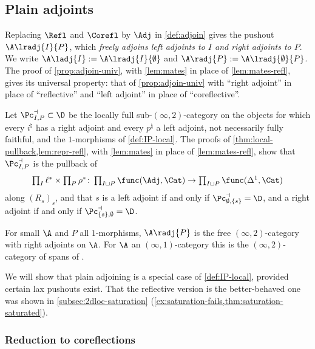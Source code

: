 \subsection{Plain adjoints}
\label{subsec:2dloc-plain}

Replacing $\Refl$ and $\Corefl$ by $\Adj$ in \cref{def:adjoin} gives the pushout $\A\lradj{I}{P}$, which \emph{freely adjoins left adjoints to $I$ and right adjoints to $P$}. We write $\A\ladj{I} := \A\lradj{I}{\emptyset}$ and $\A\radj{P} := \A\lradj{\emptyset}{P}$.
The proof of \cref{prop:adjoin-univ}, with \cref{lem:mates} in place of \cref{lem:mates-refl}, gives its universal property: that of \cref{prop:adjoin-univ} with ``right adjoint'' in place of ``reflective'' and ``left adjoint'' in place of ``coreflective''.

Let $\Pc^{\dashv}_{I,P} \subset \D$ be the locally full sub-$(\infty,2)$-category on the objects for which every $i^{\natural}$ has a right adjoint and every $p^{\natural}$ a left adjoint, not necessarily fully faithful, and the $1$-morphisms of \cref{def:IP-local}.
The proofs of \cref{thm:local-pullback,lem:repr-refl}, with \cref{lem:mates} in place of \cref{lem:mates-refl}, show that $\Pc^{\dashv}_{I,P}$ is the pullback of
\[
\textstyle\prod_{I}\ell^{*} \times \prod_{P}\rho^{*}\colon \prod_{I \sqcup P}\func(\Adj,\Cat) \to \prod_{I \sqcup P}\func(\Delta^{1},\Cat)
\]
along $(R_{s})_{s}$, and that $s$ is a left adjoint if and only if $\Pc^{\dashv}_{\emptyset,\{s\}} = \D$, and a right adjoint if and only if $\Pc^{\dashv}_{\{s\},\emptyset} = \D$.

\begin{exmp}
\label{ex:plain-spans}
For small $\A$ and $P$ all $1$-morphisms, $\A\radj{P}$ is the free $(\infty,2)$-category with right adjoints on $\A$. For $\A$ an $(\infty,1)$-category this is the $(\infty,2)$-category of spans of \cite{haugseng2018iteratedspans,cnossenlenzlinskens2025universal}.
\end{exmp}

We will show that plain adjoining is a special case of \cref{def:IP-local}, provided certain lax pushouts exist. That the reflective version is the better-behaved one was shown in \cref{subsec:2dloc-saturation} (\cref{ex:saturation-fails,thm:saturation-saturated}).

\subsubsection*{Reduction to coreflections}

